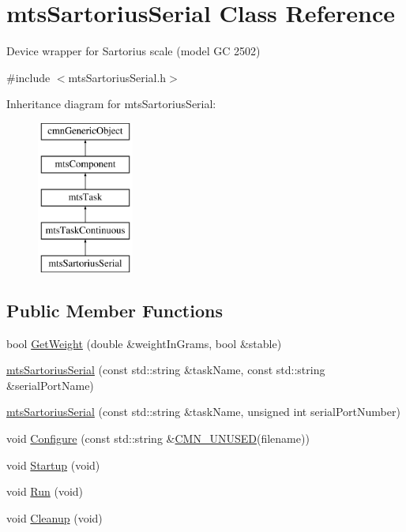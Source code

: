 \hypertarget{classmts_sartorius_serial}{}\section{mts\+Sartorius\+Serial Class Reference}
\label{classmts_sartorius_serial}


Device wrapper for Sartorius scale (model G\+C 2502)  




{\ttfamily \#include $<$mts\+Sartorius\+Serial.\+h$>$}

Inheritance diagram for mts\+Sartorius\+Serial\+:\begin{figure}[H]
\begin{center}
\leavevmode
\includegraphics[height=5.000000cm]{d7/d2d/classmts_sartorius_serial}
\end{center}
\end{figure}
\subsection*{Public Member Functions}
\begin{DoxyCompactItemize}
\item 
bool \hyperlink{classmts_sartorius_serial_af3579fe150c87aab9d81ac6267e5cc6b}{Get\+Weight} (double \&weight\+In\+Grams, bool \&stable)
\item 
\hyperlink{classmts_sartorius_serial_ab768cdb000bad4801243ddf1af876d27}{mts\+Sartorius\+Serial} (const std\+::string \&task\+Name, const std\+::string \&serial\+Port\+Name)
\item 
\hyperlink{classmts_sartorius_serial_ae0f3fd72900f7f99ccfb07612597cb45}{mts\+Sartorius\+Serial} (const std\+::string \&task\+Name, unsigned int serial\+Port\+Number)
\item 
void \hyperlink{classmts_sartorius_serial_ae6b6992083c4e16a241634b1c976efee}{Configure} (const std\+::string \&\hyperlink{cmn_portability_8h_a021894e2626935fa2305434b1e893ff6}{C\+M\+N\+\_\+\+U\+N\+U\+S\+E\+D}(filename))
\item 
void \hyperlink{classmts_sartorius_serial_a8c18b429ecc6c7dba66ebf23ca1598e0}{Startup} (void)
\item 
void \hyperlink{classmts_sartorius_serial_aa3bb133f25535f1b9af2f2da6356ad18}{Run} (void)
\item 
void \hyperlink{classmts_sartorius_serial_a4fc8df844c89fb18b492d607d43157e9}{Cleanup} (void)
\end{DoxyCompactItemize}

